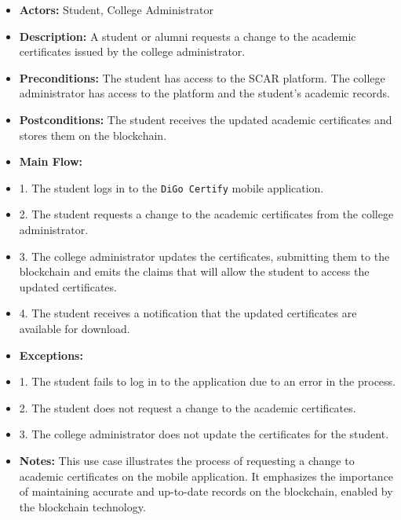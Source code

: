 \begin{itemize}

    \item \textbf{Actors:} Student, College Administrator
    \item \textbf{Description:} A student or alumni requests a change to the academic certificates issued by the college administrator.
    \item \textbf{Preconditions:} The student has access to the SCAR platform. The college administrator has access to the platform and the student's academic records.
    \item \textbf{Postconditions:} The student receives the updated academic certificates and stores them on the blockchain.
    \item \textbf{Main Flow:}
    \item 1. The student logs in to the \texttt{DiGo Certify} mobile application.
    \item 2. The student requests a change to the academic certificates from the college administrator.
    \item 3. The college administrator updates the certificates, submitting them to the blockchain and emits the claims that will allow the student to access the updated certificates.
    \item 4. The student receives a notification that the updated certificates are available for download.
    \item \textbf{Exceptions:}
    \item 1. The student fails to log in to the application due to an error in the process.
    \item 2. The student does not request a change to the academic certificates.
    \item 3. The college administrator does not update the certificates for the student.
    \item \textbf{Notes:} This use case illustrates the process of requesting a change to academic certificates on the mobile application. It emphasizes the importance of maintaining accurate and up-to-date records on the blockchain, enabled by the blockchain technology.

\end{itemize}
